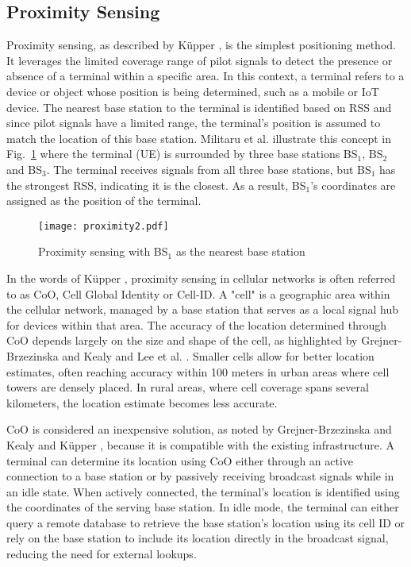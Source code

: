 \subsection{Proximity Sensing}
Proximity sensing, as described by K\"upper \cite{kupper2005location}, is the simplest positioning method.
It leverages the limited coverage range of pilot signals to detect the presence or absence of a terminal within a specific area.
In this context, a terminal refers to a device or object whose position is being determined, such as a mobile or \ac{IoT} device.
The nearest base station to the terminal is identified based on \ac{RSS} and since pilot signals have a limited range, the terminal's position is assumed to match the location of this base station.
Militaru et al. \cite{militaru2022positioning} illustrate this concept in Fig.~\ref{fig:proximity2} where the terminal (UE) is surrounded by three base stations BS$_1$, BS$_2$ and BS$_3$. 
The terminal receives signals from all three base stations, but BS$_1$ has the strongest \acs{RSS}, indicating it is the closest. 
As a result, BS$_1$'s coordinates are assigned as the position of the terminal.

\begin{figure}[htbp]
    \centering
    \texttt{[image: proximity2.pdf]}
    \caption{Proximity sensing with BS$_1$ as the nearest base station \cite{militaru2022positioning}}
    \label{fig:proximity2}
\end{figure}

In the words of K\"upper \cite{kupper2005location}, proximity sensing in cellular networks is often referred to as \ac{CoO}, Cell Global Identity or Cell-ID. 
A "cell" is a geographic area within the cellular network, managed by a base station that serves as a local signal hub for devices within that area. 
The accuracy of the location determined through \acs{CoO} depends largely on the size and shape of the cell, as highlighted by Grejner-Brzezinska and Kealy \cite{grejner2004positioning} and Lee et al. \cite{lee2014localization}.
Smaller cells allow for better location estimates, often reaching accuracy within 100 meters in urban areas where cell towers are densely placed.
In rural areas, where cell coverage spans several kilometers, the location estimate becomes less accurate.

\acs{CoO} is considered an inexpensive solution, as noted by Grejner-Brzezinska and Kealy \cite{grejner2004positioning} and K\"upper \cite{kupper2005location}, because it is compatible with the existing infrastructure. 
A terminal can determine its location using \acs{CoO} either through an active connection to a base station or by passively receiving broadcast signals while in an idle state. 
When actively connected, the terminal's location is identified using the coordinates of the serving base station. 
In idle mode, the terminal can either query a remote database to retrieve the base station's location using its cell ID or rely on the base station to include its location directly in the broadcast signal, reducing the need for external lookups. 

